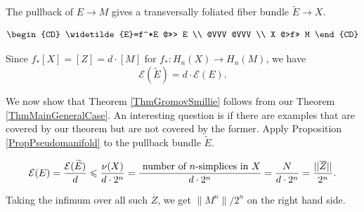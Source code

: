 \documentclass[12pt]{amsart}
\theoremstyle{plain}
\theoremstyle{definition}
\theoremstyle{plain}
\theoremstyle{definition}
\renewcommand{\leq}{\leqslant}
\begin{document}
 

           

 

        
   The pullback of $E\rightarrow M$ gives a transversally foliated fiber bundle  $\widetilde{E}\rightarrow X$. 

\[
\begin{CD}
\widetilde{E}=f^*E @>>> E \\
@VVV         @VVV \\
X @>f>> M
\end{CD}
\]


 Since $f_*[X] = [Z] = d\cdot [M]$ for $f_*:H_n(X)\rightarrow H_n(M)$, we have $$\mathcal{E}(\widetilde{E}) = d\cdot \mathcal{E}(E).$$
        
        
      



   
  We now show that Theorem \ref{ThmGromovSmillie} follows from our Theorem \ref{ThmMainGeneralCase}.   An interesting question is if there are examples that are covered by our theorem but are not covered by the former. Apply Proposition \ref{PropPseudomanifold} to the pullback bundle $\widetilde{E}$.
   

  
   
     $$\mathcal{E}(E) = \frac{\mathcal{E}(\widetilde{E})}{d}\leq  \frac{\nu(X)}{d\cdot 2^n} =  \frac{\hbox{ number of $n$-simplices in $X$}}{d\cdot 2^n}=  \frac{N}{d\cdot 2^n}=\frac{||\overline{Z}||}{ 2^n}.$$

 Taking the infimum over all such $\overline{Z}$, we get $\|M^n\|/2^n$ on the right hand side.

  

	
\end{document}
